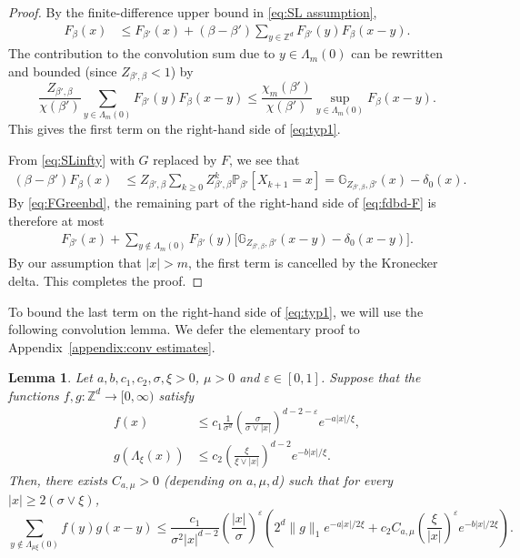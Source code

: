 \documentclass[11pt,a4paper]{article}
\numberwithin{equation}{section}
\theoremstyle{plain}
\newtheorem{Lem}[Thm]{Lemma}
\theoremstyle{definition}
\newcommand\1{\mathds{1}}
\begin{document}
\begin{proof}
By the finite-difference upper bound in \eqref{eq:SL assumption},
\begin{align}
\label{eq:fdbd-F}
    F_{\beta}(x) &\leq F_{\beta'}(x) + (\beta-\beta')
    \sum_{y\in \mathbb Z^d}F_{\beta'}(y) F_{\beta}(x-y).
\end{align}
The contribution to the convolution sum due to $y \in \Lambda_m(0)$
can be rewritten and bounded (since $Z_{\beta',\beta}< 1$) by\begin{equation}
    \frac{Z_{\beta',\beta}}{\chi(\beta')}
    \sum_{y \in \Lambda_{m}(0) }F_{\beta'}(y)F_{\beta}(x-y)
    \le
    \frac{\chi_m(\beta')}{\chi(\beta')} \sup_{y \in \Lambda_m(0)} F_\beta(x-y).
\end{equation}
This gives the first term on the right-hand side
of \eqref{eq:typ1}.

From \eqref{eq:SLinfty} with $G$ replaced by $F$, we see that
\begin{align}
\label{eq:FGreenbd}
    (\beta-\beta') F_\beta(x) &
    \le
    Z_{\beta',\beta}
    \sum_{k\geq 0}Z_{\beta',\beta}^k \mathbb P_{\beta'}[X_{k+1}=x]
    =
    \mathbb G_{Z_{\beta',\beta},\beta'}(x) - \delta_{0}(x).
\end{align}
By \eqref{eq:FGreenbd}, the remaining part of the right-hand side
of \eqref{eq:fdbd-F} is therefore at most
\begin{align}
    F_{\beta'}(x) +
    \sum_{y\notin \Lambda_{m}(0)}F_{\beta'}(y)
    \big[ \mathbb G_{Z_{\beta',\beta},\beta'}(x-y) - \delta_{0}(x-y) \big].
\end{align}
By our assumption that $|x|>m$, the first term is cancelled by the Kronecker delta.
This completes the proof.
\end{proof}


To bound the last term on the right-hand side of
\eqref{eq:typ1}, we will use the following convolution lemma. We defer the elementary proof to Appendix~\ref{appendix:conv estimates}.



\begin{Lem}
\label{lemma:fstarg}
Let $a,b,c_1,c_2,\sigma,\xi >0$,
$\mu>0$ and $\varepsilon \in [ 0,1]$.
Suppose that the functions $f,g: \mathbb Z^d \to [0,\infty)$ satisfy
\begin{align}
    f(x)
    &\le
    c_1\frac{1}{\sigma^d} \left( \frac{\sigma}{\sigma\vee |x|}\right)^{d-2-\varepsilon}
    e^{-a|x|/\xi},
    \\
    g(\Lambda_\xi(x))
    &\le
    c_2\left( \frac{\xi}{\xi\vee |x|}\right)^{d-2}
    e^{-b|x|/\xi}.
\end{align}
Then, there exists $C_{a,\mu}>0$ (depending on $a,\mu,d$) such that  for every $|x| \ge 2 (\sigma \vee \xi)$,
\begin{equation}
\label{eq:fstarg}
    \sum_{y \notin \Lambda_{ \mu \xi}(0)} f(y)g(x-y)
    \le \frac{c_1}{\sigma^2|x|^{d-2}} \left(\frac{|x|}{\sigma}\right)^\varepsilon
    \left(
    2^{d} \|g\|_1  e^{-a|x|/2\xi}
    +
    c_2C_{a,\mu}\left(\frac{\xi}{|x|}\right)^\varepsilon e^{-b|x|/2\xi}
    \right).
\end{equation}
\end{Lem}
\end{document}
